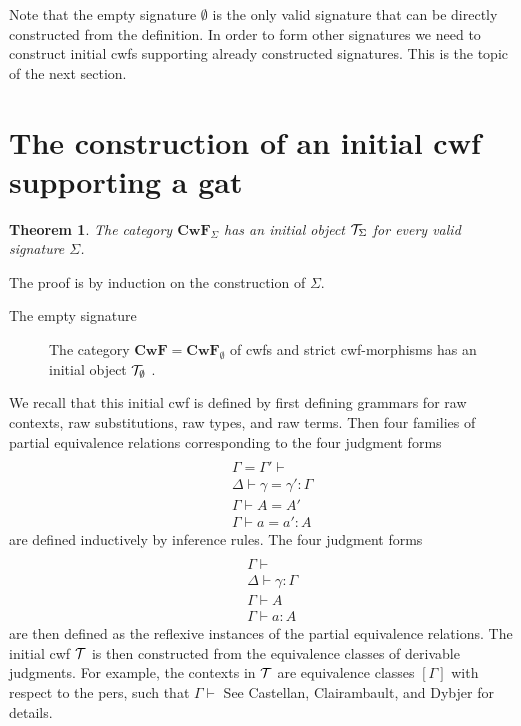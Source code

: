 \documentclass{lmcs}
\newtheorem{theorem}{Theorem}
\def\Cwf{\mathbf{CwF}}
\begin{document}
Note that the empty signature $\emptyset$ is the only valid signature that can be directly constructed from the definition. In order to form other signatures we need to construct initial cwfs supporting already constructed signatures. This is the topic of the next section.

\section{The construction of an initial cwf supporting a gat}

\begin{theorem}
The category $\Cwf_\Sigma$ has an initial object ${\mathcal T}_\Sigma$ for every valid signature $\Sigma$.
\end{theorem}

The proof is by induction on the construction of $\Sigma$.
\begin{description}
\item[The empty signature] 
The category $\Cwf = \Cwf_\emptyset$ of cwfs and strict cwf-morphisms has an initial object ${\mathcal T}_\emptyset$ \cite{castellan}.
\end{description}

We recall that this initial cwf is defined by first defining grammars for raw contexts, raw substitutions, raw types, and raw terms. Then four families of partial equivalence relations corresponding to the four judgment forms
\begin{eqnarray*}
\\&&\Gamma = \Gamma' \vdash
\\&&\Delta \vdash \gamma = \gamma' : \Gamma
\\&&\Gamma \vdash A = A'
\\&&\Gamma \vdash a = a' : A
\end{eqnarray*}
are defined inductively by inference rules. The four judgment forms
\begin{eqnarray*}
\\&&\Gamma \vdash
\\&&\Delta \vdash \gamma : \Gamma
\\&&\Gamma \vdash A
\\&&\Gamma \vdash a : A
\end{eqnarray*}
are then defined as the reflexive instances of the partial equivalence relations. The initial cwf ${\mathcal T}$ is then constructed from the equivalence classes of derivable judgments. For example, the contexts in ${\mathcal T}$ are equivalence classes $[\Gamma]$ with respect to the pers, such that $\Gamma \vdash$ See Castellan, Clairambault, and Dybjer \cite{castellan:warsaw,castellan:lmcs} for details.
\end{document}
